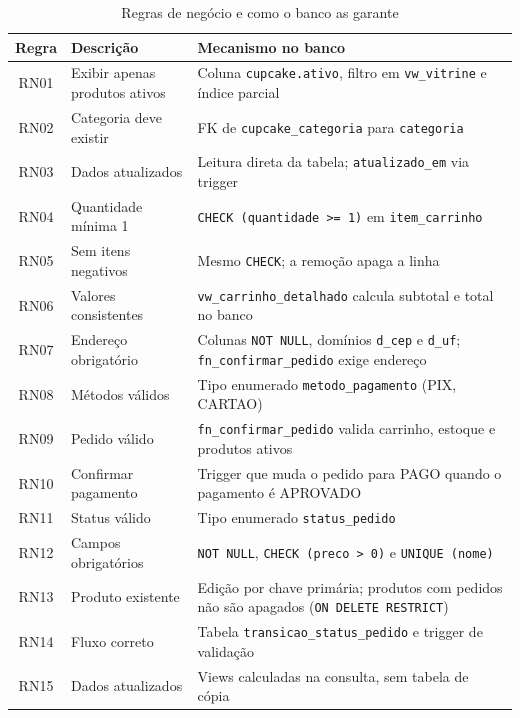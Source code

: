 \documentclass[12pt]{article}
\begin{document}
\begin{table}[H]
\centering
\small
\renewcommand{\arraystretch}{1.25}
\begin{tabular}{|c|p{5cm}|p{6.2cm}|}
\hline
\rowcolor{gray!40} \textbf{Regra} & \textbf{Descrição} & \textbf{Mecanismo no banco} \\ \hline
RN01 & Exibir apenas produtos ativos & Coluna \texttt{cupcake.ativo}, filtro em \texttt{vw\_vitrine} e índice parcial \\ \hline
RN02 & Categoria deve existir & FK de \texttt{cupcake\_categoria} para \texttt{categoria} \\ \hline
RN03 & Dados atualizados & Leitura direta da tabela; \texttt{atualizado\_em} via trigger \\ \hline
RN04 & Quantidade mínima 1 & \texttt{CHECK (quantidade >= 1)} em \texttt{item\_carrinho} \\ \hline
RN05 & Sem itens negativos & Mesmo \texttt{CHECK}; a remoção apaga a linha \\ \hline
RN06 & Valores consistentes & \texttt{vw\_carrinho\_detalhado} calcula subtotal e total no banco \\ \hline
RN07 & Endereço obrigatório & Colunas \texttt{NOT NULL}, domínios \texttt{d\_cep} e \texttt{d\_uf}; \texttt{fn\_confirmar\_pedido} exige endereço \\ \hline
RN08 & Métodos válidos & Tipo enumerado \texttt{metodo\_pagamento} (PIX, CARTAO) \\ \hline
RN09 & Pedido válido & \texttt{fn\_confirmar\_pedido} valida carrinho, estoque e produtos ativos \\ \hline
RN10 & Confirmar pagamento & Trigger que muda o pedido para PAGO quando o pagamento é APROVADO \\ \hline
RN11 & Status válido & Tipo enumerado \texttt{status\_pedido} \\ \hline
RN12 & Campos obrigatórios & \texttt{NOT NULL}, \texttt{CHECK (preco > 0)} e \texttt{UNIQUE (nome)} \\ \hline
RN13 & Produto existente & Edição por chave primária; produtos com pedidos não são apagados (\texttt{ON DELETE RESTRICT}) \\ \hline
RN14 & Fluxo correto & Tabela \texttt{transicao\_status\_pedido} e trigger de validação \\ \hline
RN15 & Dados atualizados & Views calculadas na consulta, sem tabela de cópia \\ \hline
\end{tabular}
\caption{Regras de negócio e como o banco as garante}
\end{table}
\end{document}

